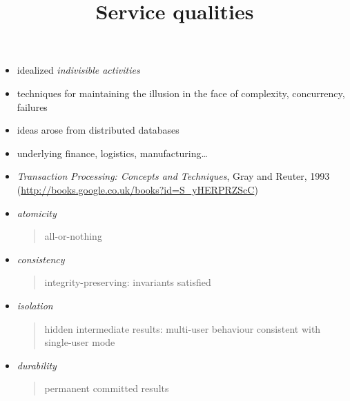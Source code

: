 \documentclass{sepslide-soa-faked} %
\title{Service qualities}
\begin{document}
\begin{slide}
  \Title
\end{slide}

\begin{slide}
  \Contents
\end{slide}

\begin{slide}
\begin{itemize}
\item idealized \emph{indivisible activities}
\item techniques for maintaining the illusion in the face of complexity, concurrency, failures
\item ideas arose from distributed databases
\item underlying finance, logistics, manufacturing\ldots
\item \textit{Transaction Processing: Concepts and Techniques}, Gray and Reuter, 1993 (\url{http://books.google.co.uk/books?id=S_yHERPRZScC})
\end{itemize}
\end{slide}

\begin{slide}
\begin{itemize}
\item \emph{atomicity}
\begin{quote}
all-or-nothing
\end{quote}
\item \emph{consistency}
\begin{quote}
integrity-preserving: invariants satisfied
\end{quote}
\item \emph{isolation}
\begin{quote}
hidden intermediate results:
multi-user behaviour consistent with single-user mode
\end{quote}
\item \emph{durability}
\begin{quote}
permanent committed results
\end{quote}
\end{itemize}
\end{slide}
\end{document}
